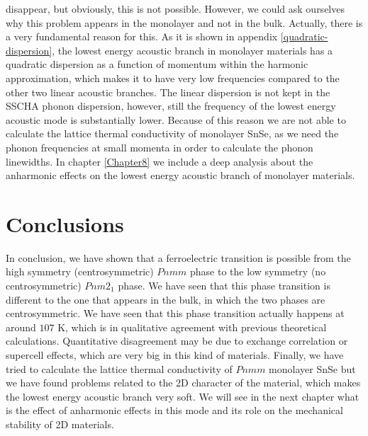 disappear, but obviously, this is not possible. However, we could ask ourselves why this problem appears in the 
monolayer and not in the bulk. Actually, there is a very fundamental reason for this. As it 
is shown in appendix \ref{quadratic-dispersion}, the lowest energy acoustic branch in monolayer materials has a 
quadratic dispersion as a function of momentum within the harmonic approximation, which makes it to have very low 
frequencies compared to the other two linear acoustic branches. The linear dispersion is not kept in the SSCHA phonon
dispersion, however, still the frequency of the lowest energy acoustic mode is substantially lower. Because of this 
reason we are not able to calculate the lattice thermal conductivity of monolayer SnSe, as we need the phonon 
frequencies at small momenta in order to calculate the phonon linewidths. In chapter \ref{Chapter8} we include a 
deep analysis about the anharmonic effects on the lowest energy acoustic branch of monolayer materials.

\section{Conclusions}

In conclusion, we have shown that a ferroelectric transition is possible from the high symmetry (centrosymmetric) 
$Pnmm$ phase to the low symmetry (no centrosymmetric) $Pnm2_{1}$ phase. We have seen that this phase transition 
is different to the one that appears in the bulk, in which the two phases are centrosymmetric. We have seen that 
this phase transition actually happens at around $107$ K, which is in qualitative agreement with previous 
theoretical calculations. Quantitative disagreement may be due to exchange correlation or supercell effects, which 
are very big in this kind of materials. Finally, we have tried to calculate the lattice thermal conductivity of 
$Pnmm$ monolayer SnSe but we have found problems related to the 2D character of the material, which makes the lowest 
energy acoustic branch very soft. We will see in the next chapter what is the effect of anharmonic effects in this 
mode and its role on the mechanical stability of 2D materials.
